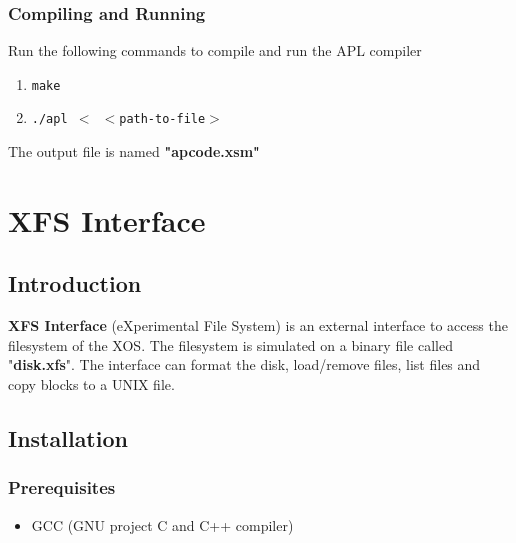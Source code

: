\documentclass[11pt]{report}
\begin{document}

\subsection{Compiling and Running}
Run the following commands to compile and run the APL compiler
\begin{enumerate}
		\item \texttt{make}
		\item \texttt{./apl $<$ $<$path-to-file$>$ }
\end{enumerate}

The output file is named \textbf{"apcode.xsm"}

\chapter{XFS Interface}

\section{Introduction}
\textbf{XFS Interface} (eXperimental File System) is an external interface to access the filesystem of the XOS. The filesystem is simulated on a binary file called "\textbf{disk.xfs}". The interface can format the disk, load/remove files, list files and copy blocks to a UNIX file.

\section{Installation}
\subsection{Prerequisites}
\begin{itemize}
	\item GCC (GNU project C and C++ compiler)
\end{itemize}

%
\end{document}
